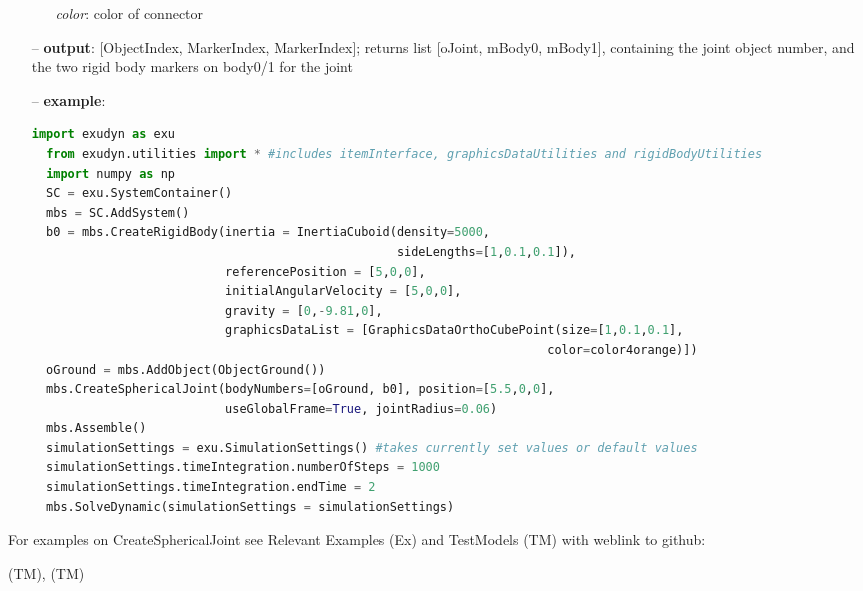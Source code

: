 \begin{itemize}[leftmargin=0.7cm]
\begin{itemize}[leftmargin=1.2cm]
\item[]{\it color}: color of connector
\end{itemize}
\item[--]
{\bf output}: [ObjectIndex, MarkerIndex, MarkerIndex]; returns list [oJoint, mBody0, mBody1], containing the joint object number, and the two rigid body markers on body0/1 for the joint
\item[--]
{\bf example}: \vspace{-12pt}\ei\begin{lstlisting}[language=Python, xleftmargin=36pt]
  import exudyn as exu
  from exudyn.utilities import * #includes itemInterface, graphicsDataUtilities and rigidBodyUtilities
  import numpy as np
  SC = exu.SystemContainer()
  mbs = SC.AddSystem()
  b0 = mbs.CreateRigidBody(inertia = InertiaCuboid(density=5000,
                                                   sideLengths=[1,0.1,0.1]),
                           referencePosition = [5,0,0],
                           initialAngularVelocity = [5,0,0],
                           gravity = [0,-9.81,0],
                           graphicsDataList = [GraphicsDataOrthoCubePoint(size=[1,0.1,0.1],
                                                                        color=color4orange)])
  oGround = mbs.AddObject(ObjectGround())
  mbs.CreateSphericalJoint(bodyNumbers=[oGround, b0], position=[5.5,0,0],
                           useGlobalFrame=True, jointRadius=0.06)
  mbs.Assemble()
  simulationSettings = exu.SimulationSettings() #takes currently set values or default values
  simulationSettings.timeIntegration.numberOfSteps = 1000
  simulationSettings.timeIntegration.endTime = 2
  mbs.SolveDynamic(simulationSettings = simulationSettings)
\end{lstlisting}\vspace{-24pt}\bi\item[]\vspace{-24pt}\vspace{12pt}\end{itemize}
%

%
\noindent For examples on CreateSphericalJoint see Relevant Examples (Ex) and TestModels (TM) with weblink to github:
\bi
 \item \footnotesize {} (TM), 
 (TM)
\ei

